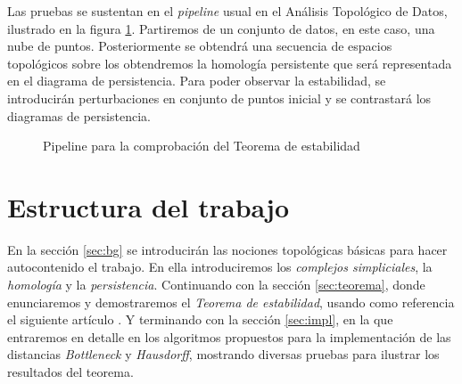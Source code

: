 Las pruebas se sustentan en el \emph{pipeline} usual en el Análisis Topológico de Datos, ilustrado en la figura \ref{ref:pipeline}. Partiremos de un conjunto de datos, en este caso, una nube de puntos. Posteriormente se obtendrá una secuencia de espacios topológicos sobre los obtendremos la homología persistente que será representada en el diagrama de persistencia. Para poder observar la estabilidad, se introducirán perturbaciones en conjunto de puntos inicial y se contrastará los diagramas de persistencia.

\begin{figure}[ht]
\centering
{}
\caption{Pipeline para la comprobación del Teorema de estabilidad}
\label{ref:pipeline}
\end{figure}

\section{Estructura del trabajo}
En la sección \ref{sec:bg} se introducirán las nociones topológicas básicas para hacer autocontenido el trabajo. En ella introduciremos los \emph{complejos simpliciales}, la \emph{homología} y la \emph{persistencia}. Continuando con la sección \ref{sec:teorema}, donde enunciaremos y demostraremos el \emph{Teorema de estabilidad}, usando como referencia el siguiente artículo \cite{Cohen-Steiner2007}. Y terminando con la sección \ref{sec:impl}, en la que entraremos en detalle en los algoritmos propuestos para la implementación de las distancias \emph{Bottleneck} y \emph{Hausdorff}, mostrando diversas pruebas para ilustrar los resultados del teorema.
